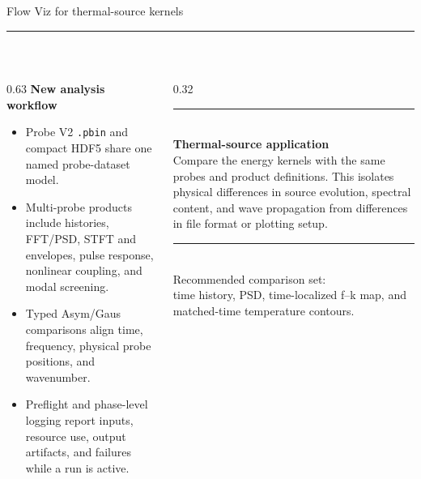 \documentclass[aspectratio=169,10pt]{beamer}
\title{\decktitle}
\author{}
\date{}
\newcommand{\decktitle}{Flow Viz for thermal-source kernels}
\begin{document}
\begin{frame}[t]{\decktitle}
  \vspace{-0.2em}
  {\color{FlowGold}\rule{0.96\textwidth}{1.25pt}}\\[0.7em]

  \begin{columns}[T,onlytextwidth]
    \begin{column}{0.63\textwidth}
      \textbf{New analysis workflow}\\[0.6em]
      \begin{itemize}\setlength\itemsep{0.8em}
        \item Probe V2 \texttt{.pbin} and compact HDF5 share one named probe-dataset model.
        \item Multi-probe products include histories, FFT/PSD, STFT and envelopes, pulse response, nonlinear coupling, and modal screening.
        \item Typed Asym/Gaus comparisons align time, frequency, physical probe positions, and wavenumber.
        \item Preflight and phase-level logging report inputs, resource use, output artifacts, and failures while a run is active.
      \end{itemize}
    \end{column}
    \begin{column}{0.32\textwidth}
      \vspace{0.1em}
      {\color{FlowBlue}\rule{\textwidth}{0.7pt}}\\[-0.1em]
      \textbf{Thermal-source application}\\[0.55em]
      \small
      Compare the energy kernels with the same probes and product definitions. This isolates physical differences in source evolution, spectral content, and wave propagation from differences in file format or plotting setup.\\[1.0em]
      {\color{FlowGold}\rule{\textwidth}{0.7pt}}\\[-0.1em]
      \footnotesize
      Recommended comparison set:\\[0.35em]
      time history, PSD, time-localized f--k map, and matched-time temperature contours.
    \end{column}
  \end{columns}
\end{frame}
\end{document}
